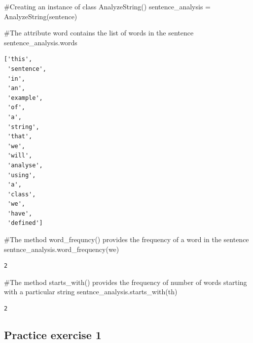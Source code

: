 \documentclass[
  letterpaper,
  DIV=11,
  numbers=noendperiod]{scrreprt}
\newenvironment{Shaded}{\begin{snugshade}}{\end{snugshade}}
\newcommand{\CommentTok}[1]{\textcolor[rgb]{0.37,0.37,0.37}{#1}}
\newcommand{\NormalTok}[1]{\textcolor[rgb]{0.00,0.23,0.31}{#1}}
\newcommand{\OperatorTok}[1]{\textcolor[rgb]{0.37,0.37,0.37}{#1}}
\newcommand{\StringTok}[1]{\textcolor[rgb]{0.13,0.47,0.30}{#1}}
\begin{document}
\begin{Shaded}
\begin{Highlighting}[]
\CommentTok{\#Creating an instance of class AnalyzeString()}
\NormalTok{sentence\_analysis }\OperatorTok{=}\NormalTok{ AnalyzeString(sentence)}
\end{Highlighting}
\end{Shaded}

\begin{Shaded}
\begin{Highlighting}[]
\CommentTok{\#The attribute \textquotesingle{}word\textquotesingle{} contains the list of words in the sentence}
\NormalTok{sentence\_analysis.words}
\end{Highlighting}
\end{Shaded}

\begin{verbatim}
['this',
 'sentence',
 'in',
 'an',
 'example',
 'of',
 'a',
 'string',
 'that',
 'we',
 'will',
 'analyse',
 'using',
 'a',
 'class',
 'we',
 'have',
 'defined']
\end{verbatim}

\begin{Shaded}
\begin{Highlighting}[]
\CommentTok{\#The method \textquotesingle{}word\_frequncy()\textquotesingle{} provides the frequency of a word in the sentence}
\NormalTok{sentnce\_analysis.word\_frequency(}\StringTok{\textquotesingle{}we\textquotesingle{}}\NormalTok{)}
\end{Highlighting}
\end{Shaded}

\begin{verbatim}
2
\end{verbatim}

\begin{Shaded}
\begin{Highlighting}[]
\CommentTok{\#The method \textquotesingle{}starts\_with()\textquotesingle{} provides the frequency of number of words starting with a particular string}
\NormalTok{sentnce\_analysis.starts\_with(}\StringTok{\textquotesingle{}th\textquotesingle{}}\NormalTok{)}
\end{Highlighting}
\end{Shaded}

\begin{verbatim}
2
\end{verbatim}

\hypertarget{practice-exercise-1-4}{%
\subsection{Practice exercise 1}\label{practice-exercise-1-4}}
\end{document}
